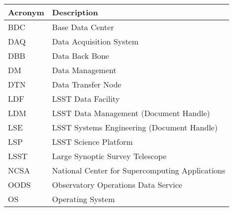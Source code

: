 \addtocounter{table}{-1}
\begin{longtable}{p{}p{}}\hline
\textbf{Acronym} & \textbf{Description}  \\\hline

BDC &  Base Data Center \\\hline
DAQ & Data Acquisition System \\\hline
DBB & Data Back Bone \\\hline
DM & Data Management \\\hline
DTN & Data Transfer Node \\\hline
LDF & LSST Data Facility \\\hline
LDM & LSST Data Management (Document Handle) \\\hline
LSE & LSST Systems Engineering (Document Handle) \\\hline
LSP & LSST Science Platform \\\hline
LSST & Large Synoptic Survey Telescope \\\hline
NCSA & National Center for Supercomputing Applications \\\hline
OODS & Observatory Operations Data Service \\\hline
OS & Operating System \\\hline
\end{longtable}
